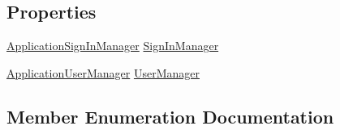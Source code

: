 \subsection*{Properties}
\begin{DoxyCompactItemize}
\item 
\hyperlink{class_bibabook_1_1_application_sign_in_manager}{Application\+Sign\+In\+Manager} \hyperlink{class_bibabook_1_1_controllers_1_1_manage_controller_a6ca8e2674446d848d3e55ad11c6a793d}{Sign\+In\+Manager}
\item 
\hyperlink{class_bibabook_1_1_application_user_manager}{Application\+User\+Manager} \hyperlink{class_bibabook_1_1_controllers_1_1_manage_controller_a81e4c8f2c91ff5ff9a7bf29c40a26fac}{User\+Manager}
\end{DoxyCompactItemize}


\subsection{Member Enumeration Documentation}
\hypertarget{class_bibabook_1_1_controllers_1_1_manage_controller_a11520cf302554950f1aeac2bd8137403}{}
